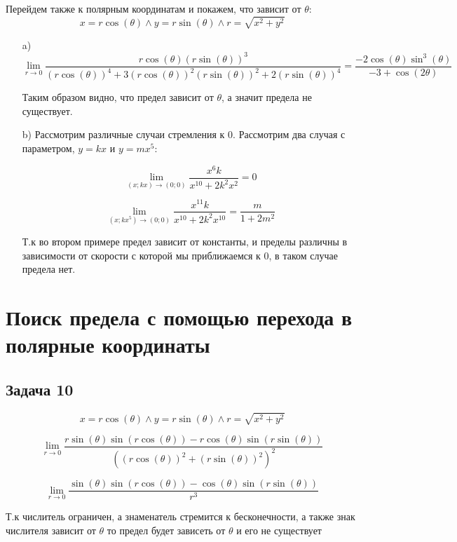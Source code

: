 \documentclass[a4paper,12pt]{article}
\begin{document}
Перейдем также к полярным координатам и покажем, что зависит от $\theta$:
\[
    x = r\cos(\theta) \land y = r\sin(\theta) \land r = \sqrt{x^2+y^2}
\]

\begin{enumerate}
    \item[a)] 
        \[
            \lim_{r \to 0}\frac{r\cos(\theta)(r\sin(\theta))^3}{(r\cos(\theta))^4+3(r\cos(\theta))^2(r\sin(\theta))^2+2(r\sin(\theta))^4} = \frac{-2\cos(\theta)\sin^3(\theta)}{-3+\cos(2\theta)}
        \]
        
        Таким образом видно, что предел зависит от $\theta$, а значит предела не существует.
    
    \item[b)]
        Рассмотрим различные случаи стремления к 0. Рассмотрим два случая с параметром, $y=kx$ и $y=mx^5$:
        
        \[
            \lim_{(x;kx)\to(0;0)} \frac{x^6k}{x^{10}+2k^2x^2} = 0
        \]
        
        \[
            \lim_{(x;kx^5)\to(0;0)} \frac{x^11k}{x^{10}+2k^2x^10} = \frac{m}{1+2m^2}
        \]

        Т.к во втором примере предел зависит от константы, и пределы различны в зависимости от скорости с которой мы приближаемся к 0, в таком случае предела нет.

        


\end{enumerate}

\section{Поиск предела с помощью перехода в полярные координаты}

\subsection{Задача 10}

\[
x = r\cos(\theta) \land y = r\sin(\theta) \land r = \sqrt{x^2+y^2}
\]

\[
\lim_{r \to 0} \frac{r\sin(\theta)\sin(r\cos(\theta))-r\cos(\theta)\sin(r\sin(\theta))}{((r\cos(\theta))^2+(r\sin(\theta))^2)^2}
\]

\[
\lim_{r \to 0} \frac{\sin(\theta) \sin(r \cos(\theta)) - \cos(\theta) \sin(r \sin(\theta))}{r^3}
\]

Т.к числитель ограничен, а знаменатель стремится к бесконечности, а также знак числителя зависит от $\theta$ то предел будет зависеть от $\theta$ и его не существует
\end{document}
